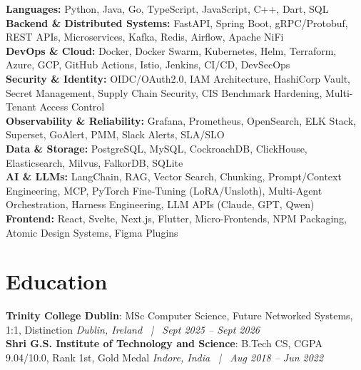 \documentclass[10pt,letterpaper]{article}
\begin{document}
{\footnotesize
\textbf{Languages:} Python, Java, Go, TypeScript, JavaScript, C++, Dart, SQL \\[1.5pt]
\textbf{Backend \& Distributed Systems:} FastAPI, Spring Boot, gRPC/Protobuf, REST APIs, Microservices, Kafka, Redis, Airflow, Apache NiFi \\[1.5pt]
\textbf{DevOps \& Cloud:} Docker, Docker Swarm, Kubernetes, Helm, Terraform, Azure, GCP, GitHub Actions, Istio, Jenkins, CI/CD, DevSecOps \\[1.5pt]
\textbf{Security \& Identity:} OIDC/OAuth2.0, IAM Architecture, HashiCorp Vault, Secret Management, Supply Chain Security, CIS Benchmark Hardening, Multi-Tenant Access Control \\[1.5pt]
\textbf{Observability \& Reliability:} Grafana, Prometheus, OpenSearch, ELK Stack, Superset, GoAlert, PMM, Slack Alerts, SLA/SLO \\[1.5pt]
\textbf{Data \& Storage:} PostgreSQL, MySQL, CockroachDB, ClickHouse, Elasticsearch, Milvus, FalkorDB, SQLite \\[1.5pt]
\textbf{AI \& LLMs:} LangChain, RAG, Vector Search, Chunking, Prompt/Context Engineering, MCP, PyTorch Fine-Tuning (LoRA/Unsloth), Multi-Agent Orchestration, Harness Engineering, LLM APIs (Claude, GPT, Qwen) \\[1.5pt]
\textbf{Frontend:} React, Svelte, Next.js, Flutter, Micro-Frontends, NPM Packaging, Atomic Design Systems, Figma Plugins
}

\section{Education}

{\footnotesize
\textbf{Trinity College Dublin}: MSc Computer Science, Future Networked Systems, 1:1, Distinction \hfill \textit{Dublin, Ireland ~|~ Sept 2025 -- Sept 2026}\\[1pt]
\textbf{Shri G.S. Institute of Technology and Science}: B.Tech CS, CGPA 9.04/10.0, Rank 1st, Gold Medal \hfill \textit{Indore, India ~|~ Aug 2018 -- Jun 2022}
}
\end{document}
